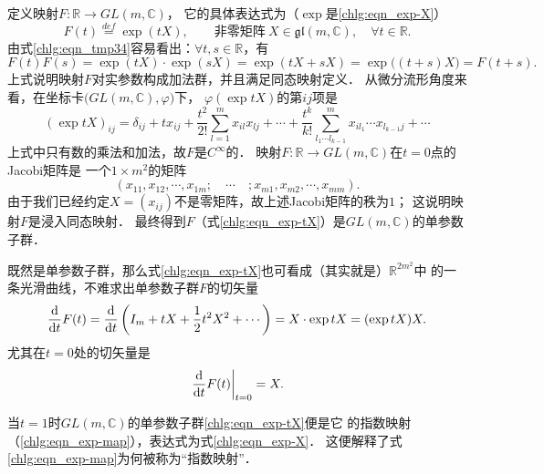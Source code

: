 定义映射$F:\mathbb{R}\to GL(m,\mathbb{C})$，
它的具体表达式为（$\exp$是\eqref{chlg:eqn_exp-X}）
\begin{equation}\label{chlg:eqn_exp-tX}
   F(t) \overset{def}{=} \exp(t X),\qquad \text{非零矩阵}\ 
      X \in \mathfrak{gl}(m,\mathbb{C}),\quad \forall t\in \mathbb{R} .
\end{equation}
由式\eqref{chlg:eqn_tmp34}容易看出：$\forall t,s \in \mathbb{R}$，有
\begin{equation*}
    F(t)F(s) = \exp(t X) \cdot \exp(s X) = \exp(t X + s X)
    =\exp\bigl((t+s) X\bigr) = F(t+s) .
\end{equation*}
上式说明映射$F$对实参数构成加法群，并且满足同态映射定义．
从微分流形角度来看，在坐标卡$\bigl(GL(m,\mathbb{C}),\varphi \bigr)$下，
$\varphi(\exp tX)$的第$ij$项是
\begin{equation*}
    (\exp tX )_{ij} = \delta_{ij} + t x_{ij} + \frac{t^2}{2!} \sum_{l=1}^{m} x_{il} x_{lj}
    + \cdots + \frac{t^k}{k!} \sum_{l_1\cdots l_{k-1}}^{m} x_{il_1} \cdots x_{l_{k-1} j}
    + \cdots 
\end{equation*}
上式中只有数的乘法和加法，故$F$是$C^\infty$的．
映射$F:\mathbb{R}\to GL(m,\mathbb{C})$在$t=0$点的Jacobi矩阵是
一个$1\times m^2$的矩阵
\begin{equation}
    (x_{11},x_{12},\cdots,x_{1m};\quad\cdots\quad;x_{m1},x_{m2},\cdots,x_{mm}) .
\end{equation}
由于我们已经约定$X=(x_{ij})$不是零矩阵，故上述Jacobi矩阵的秩为$1$；
这说明映射$F$是浸入同态映射．
最终得到$F$（式\eqref{chlg:eqn_exp-tX}）是$GL(m,\mathbb{C})$的单参数子群．


既然是单参数子群，那么式\eqref{chlg:eqn_exp-tX}也可看成（其实就是）$\mathbb{R}^{2m^2}$中
的一条光滑曲线，不难求出单参数子群$F$的切矢量
\setlength{\mathindent}{0em}
\begin{equation}\label{chlg:eqn_Dexp-all}
    \frac{{\rm d}}{{\rm d}t} F(t)
    = \frac{{\rm d}}{{\rm d}t} \left(I_m + t X 
    +\frac{1}{2}t^2 X^2 +\cdots \right)
    = X \cdot \exp tX = (\exp tX) X .
\end{equation}\setlength{\mathindent}{2em}
尤其在$t=0$处的切矢量是
\begin{equation}\label{chlg:eqn_Dexp}
    \left. \frac{{\rm d}}{{\rm d}t} F(t)\right|_{t=0}    = X .  
\end{equation}

当$t=1$时$GL(m,\mathbb{C})$的单参数子群\eqref{chlg:eqn_exp-tX}便是它
的{\kaishu 指数映射}（\eqref{chlg:eqn_exp-map}），表达式为式\eqref{chlg:eqn_exp-X}．
这便解释了式\eqref{chlg:eqn_exp-map}为何被称为“{\heiti 指数映射}”．


